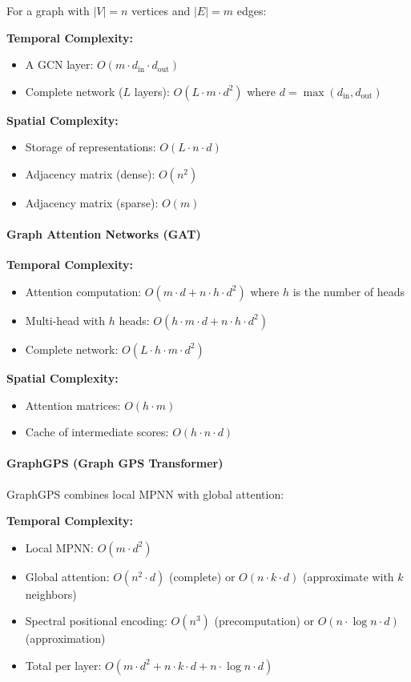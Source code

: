 For a graph with $|V| = n$ vertices and $|E| = m$ edges:

\textbf{Temporal Complexity:}
\begin{itemize}
\item A GCN layer: $O(m \cdot d_{\text{in}} \cdot d_{\text{out}})$
\item Complete network ($L$ layers): $O(L \cdot m \cdot d^2)$ where $d = \max(d_{\text{in}}, d_{\text{out}})$
\end{itemize}

\textbf{Spatial Complexity:}
\begin{itemize}
\item Storage of representations: $O(L \cdot n \cdot d)$
\item Adjacency matrix (dense): $O(n^2)$
\item Adjacency matrix (sparse): $O(m)$
\end{itemize}

\paragraph{Graph Attention Networks (GAT)}

\textbf{Temporal Complexity:}
\begin{itemize}
\item Attention computation: $O(m \cdot d + n \cdot h \cdot d^2)$ where $h$ is the number of heads
\item Multi-head with $h$ heads: $O(h \cdot m \cdot d + n \cdot h \cdot d^2)$
\item Complete network: $O(L \cdot h \cdot m \cdot d^2)$
\end{itemize}

\textbf{Spatial Complexity:}
\begin{itemize}
\item Attention matrices: $O(h \cdot m)$
\item Cache of intermediate scores: $O(h \cdot n \cdot d)$
\end{itemize}

\paragraph{GraphGPS (Graph GPS Transformer)}

GraphGPS combines local \gls{MPNN} with global attention:

\textbf{Temporal Complexity:}
\begin{itemize}
\item Local \gls{MPNN}: $O(m \cdot d^2)$
\item Global attention: $O(n^2 \cdot d)$ (complete) or $O(n \cdot k \cdot d)$ (approximate with $k$ neighbors)
\item Spectral positional encoding: $O(n^3)$ (precomputation) or $O(n \cdot \log n \cdot d)$ (approximation)
\item Total per layer: $O(m \cdot d^2 + n \cdot k \cdot d + n \cdot \log n \cdot d)$
\end{itemize}

